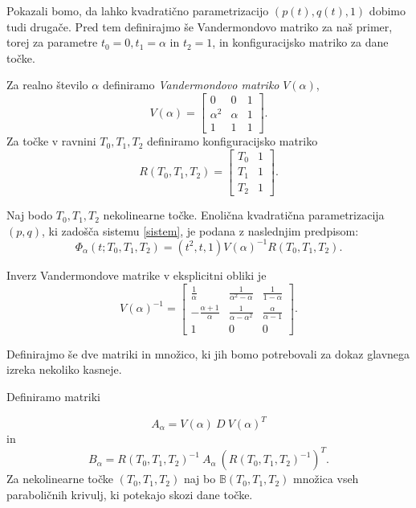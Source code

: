 \documentclass[mat1]{fmfdelo}
\newcommand{\B}{\mathbb B}
\newcommand{\al}{\alpha}
\begin{document}
Pokazali bomo, da lahko kvadratično parametrizacijo $(p(t), q(t),1)$ dobimo tudi drugače. Pred tem definirajmo še Vandermondovo matriko za naš primer, torej za parametre $t_0 = 0, t_1 = \al$ in $t_2 = 1$, in konfiguracijsko matriko za dane točke.

\begin{definicija}
Za realno število $\al$ definiramo \emph{Vandermondovo matriko} $V(\al)$,
$$V(\al) = 
\begin{bmatrix}
0 & 0 & 1 \\
\al ^2 & \al & 1 \\
1 & 1 & 1
\end{bmatrix}
.$$
Za točke v ravnini $T_0, T_1, T_2$ definiramo konfiguracijsko matriko
$$R(T_0, T_1, T_2) = 
\begin{bmatrix}
T_0 & 1 \\
T_1 & 1 \\
T_2 & 1
\end{bmatrix}
.$$
\end{definicija}


\begin{trditev}
Naj bodo $T_0, T_1, T_2$  nekolinearne točke. Enolična kvadratična parametrizacija $(p, q)$, ki zadošča sistemu \eqref{sistem}, je podana z naslednjim predpisom:
$$ \Phi_\al(t; T_0, T_1, T_2) = (t^2, t, 1) V(\al)^{-1} R(T_0, T_1, T_2).$$
\end{trditev}


\begin{opomba}
Inverz Vandermondove matrike v eksplicitni obliki je
$$
V(\al)^{-1} = 
\begin{bmatrix}
\frac{1}{\al} & \frac{1}{\al^2 - \al} & \frac{1}{1-\al} \\
- \frac{\al + 1}{\al} & \frac{1}{\al - \al^2} & \frac{\al}{\al-1} \\
1 & 0 & 0
\end{bmatrix}
.$$
\end{opomba}

Definirajmo še dve matriki in množico, ki jih bomo potrebovali za dokaz glavnega izreka nekoliko kasneje.

\begin{definicija}
Definiramo matriki

$$A_{\al} = V(\al) \ D \ V(\al)^T $$
in
$$B_{\al} =  R(T_0, T_1, T_2)^{-1}\  A_{\al} \  (R(T_0, T_1, T_2)^{-1})^T.$$
Za nekolinearne točke $(T_0, T_1, T_2)$ naj bo $\B(T_0, T_1, T_2)$ množica vseh paraboličnih krivulj, ki potekajo skozi dane točke.

\end{definicija}
\end{document}
